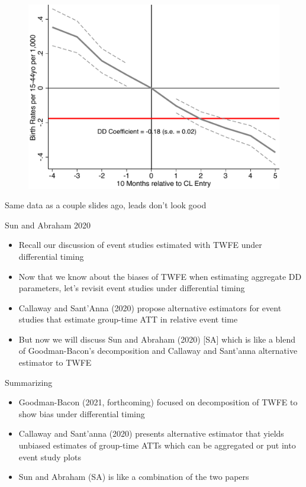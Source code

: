 \documentclass{beamer}
\begin{document}
\begin{frame}[plain]
	\begin{figure}
	\includegraphics[scale=0.5]{./lecture_includes/br1544.pdf}
	\end{figure}
	
Same data as a couple slides ago, leads don't look good
	
\end{frame}



\begin{frame}{Sun and Abraham 2020}

\begin{itemize}
\item Recall our discussion of event studies estimated with TWFE under differential timing
\item Now that we know about the biases of TWFE when estimating aggregate DD parameters, let's revisit event studies under differential timing
\item Callaway and Sant'Anna (2020) propose alternative estimators for event studies that estimate group-time ATT in relative event time
\item But now we will discuss Sun and Abraham (2020) [SA] which is like a blend of Goodman-Bacon's decomposition and Callaway and Sant'anna alternative estimator to TWFE
\end{itemize}

\end{frame}

\begin{frame}{Summarizing}

\begin{itemize}
\item Goodman-Bacon (2021, forthcoming) focused on decomposition of TWFE to show bias under differential timing
\item Callaway and Sant'anna (2020) presents alternative estimator that yields unbiased estimates of group-time ATTs which can be aggregated or put into event study plots
\item Sun and Abraham (SA) is like a combination of the two papers
\end{itemize}

\end{frame}
\end{document}
